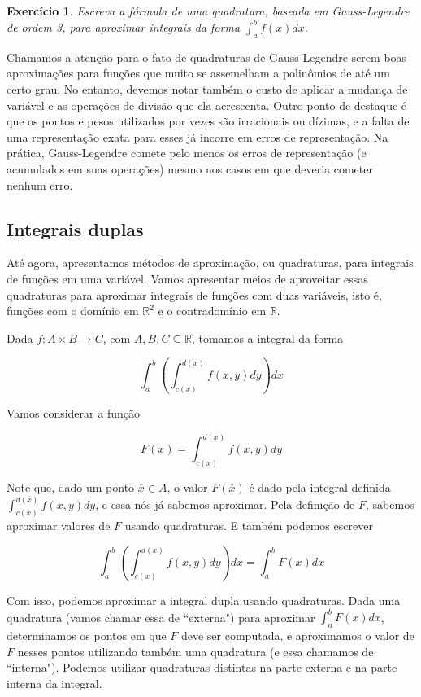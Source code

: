 \documentclass[]{article}
\newtheorem{exercicio}{Exercício}
\numberwithin{equation}{section}
\begin{document}
\begin{exercicio}
	Escreva a fórmula de uma quadratura, baseada em Gauss-Legendre de ordem 3, para aproximar integrais da forma $\int_{a}^{b} f(x) dx$.
\end{exercicio}

Chamamos a atenção para o fato de quadraturas de Gauss-Legendre serem boas aproximações para funções que muito se assemelham a polinômios de até um certo grau. No entanto, devemos notar também o custo de aplicar a mudança de variável e as operações de divisão que ela acrescenta. Outro ponto de destaque é que os pontos e pesos utilizados por vezes são irracionais ou dízimas, e a falta de uma representação exata para esses já incorre em erros de representação. Na prática, Gauss-Legendre comete pelo menos os erros de representação (e acumulados em suas operações) mesmo nos casos em que deveria cometer nenhum erro.

\subsection{Integrais duplas}

Até agora, apresentamos métodos de aproximação, ou quadraturas, para integrais de funções em uma variável. Vamos apresentar meios de aproveitar essas quadraturas para aproximar integrais de funções com duas variáveis, isto é, funções com o domínio em $\mathbb{R}^2$ e o contradomínio em $\mathbb{R}$.

Dada $f : A \times B \to C$, com $A, B, C \subseteq \mathbb{R}$, tomamos a integral da forma

$$
\int_{a}^{b} \left(\int_{c(x)}^{d(x)} f(x, y) dy\right) dx
$$

Vamos considerar a função

$$
F(x) = \int_{c(x)}^{d(x)} f(x, y) dy
$$

Note que, dado um ponto $\overline{x} \in A$, o valor $F(\overline{x})$ é dado pela integral definida $\int_{c(\overline{x})}^{d(\overline{x})} f(\overline{x}, y) dy$, e essa nós já sabemos aproximar. Pela definição de $F$, sabemos aproximar valores de $F$ usando quadraturas. E também podemos escrever

$$
\int_{a}^{b} \left(\int_{c(x)}^{d(x)} f(x, y) dy\right) dx = \int_{a}^{b} F(x) dx
$$

Com isso, podemos aproximar a integral dupla usando quadraturas. Dada uma quadratura (vamos chamar essa de ``externa") para aproximar $\int_{a}^{b} F(x) dx$,  determinamos os pontos em que $F$ deve ser computada, e aproximamos o valor de $F$ nesses pontos utilizando também uma quadratura (e essa chamamos de ``interna"). Podemos utilizar quadraturas distintas na parte externa e na parte interna da integral.
\end{document}
